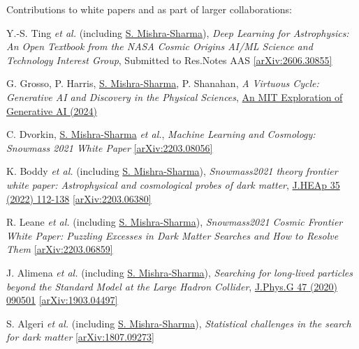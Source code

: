 \documentclass[letterpaper,11pt]{article}
\newenvironment{packed_enumerate}[1][]{
\begin{etaremune}[#1]
  \setlength{\itemsep}{4.0pt}
  \setlength{\parskip}{0pt}
  \setlength{\parsep}{0pt}}{\end{etaremune}
}
\begin{document}
\vspace{2mm}

\noindent
Contributions to white papers and as part of larger collaborations:

\begin{packed_enumerate}[start=9]

\item Y.-S. Ting \emph{et al.} (including \underline{S. Mishra-Sharma}), \emph{Deep Learning for Astrophysics: An Open Textbook from the NASA Cosmic Origins AI/ML Science and Technology Interest Group}, Submitted to Res.Notes AAS \href{https://arxiv.org/abs/2606.30855}{[arXiv:2606.30855]}

\item G. Grosso, P. Harris, \underline{S. Mishra-Sharma}, P. Shanahan, \emph{A Virtuous Cycle: Generative AI and Discovery in the Physical Sciences}, \href{https://doi.org/10.21428/e4baedd9.70ae2021}{An MIT Exploration of Generative AI (2024)}

  \item C. Dvorkin, \underline{S. Mishra-Sharma} \emph{et al.}, \emph{Machine Learning and Cosmology: Snowmass 2021 White Paper} \href{https://arxiv.org/abs/2203.08056}{[arXiv:2203.08056]}

  \item K. Boddy \emph{et al.} (including \underline{S. Mishra-Sharma}), \emph{Snowmass2021 theory frontier white paper: Astrophysical and cosmological probes of dark matter},  \href{https://www.sciencedirect.com/science/article/pii/S2214404822000349}{J.HEAp 35 (2022) 112-138} \href{https://arxiv.org/abs/2203.06380}{[arXiv:2203.06380]}

  \item R. Leane \emph{et al.} (including \underline{S. Mishra-Sharma}), \emph{Snowmass2021 Cosmic Frontier White Paper: Puzzling Excesses in Dark Matter Searches and How to Resolve Them} \href{https://arxiv.org/abs/2203.06859}{[arXiv:2203.06859]}

  \item J. Alimena \emph{et al.} (including \underline{S. Mishra-Sharma}), \emph{Searching for long-lived particles beyond the Standard Model at the Large Hadron Collider}, \href{https://iopscience.iop.org/article/10.1088/1361-6471/ab4574}{J.Phys.G 47 (2020) 090501} \href{https://arxiv.org/abs/1903.04497}{[arXiv:1903.04497]}

  \item S. Algeri \emph{et al.} (including \underline{S. Mishra-Sharma}), \emph{Statistical challenges in the search for dark matter} \href{https://arxiv.org/abs/1807.09273}{[arXiv:1807.09273]}


\end{packed_enumerate}
\end{document}
